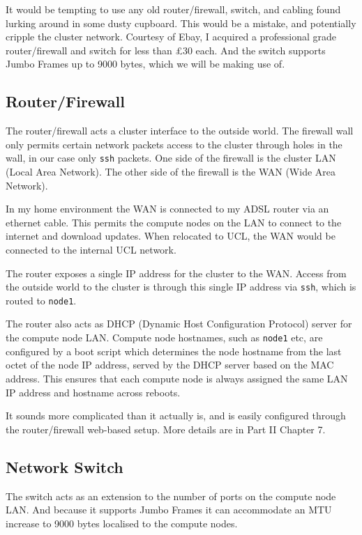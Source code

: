 \documentclass{report}
\begin{document}
It would be tempting to use any old router/firewall, switch, and cabling found lurking around in some dusty cupboard. This would be a mistake, and potentially cripple the cluster network. Courtesy of Ebay, I acquired a professional grade router/firewall and switch for less than £30 each. And the switch supports Jumbo Frames up to 9000 bytes, which we will be making use of.


%
%
\subsection{Router/Firewall}
The router/firewall acts a cluster interface to the outside world. The firewall wall only permits certain network packets access to the cluster through holes in the wall, in our case only \verb|ssh| packets. One side of the firewall is the cluster LAN (Local Area Network). The other side of the firewall is the WAN (Wide Area Network). 

In my home environment the WAN is connected to my ADSL router via an ethernet cable. This permits the compute nodes on the LAN to connect to the internet and download updates. When relocated to UCL, the WAN would be connected to the internal UCL network.

The router exposes a single IP address for the cluster to the WAN. Access from the outside world to the cluster is through this single IP address via \verb|ssh|, which is routed to \verb|node1|.

The router also acts as DHCP (Dynamic Host Configuration Protocol) server for the compute node LAN. Compute node hostnames, such as \verb|node1| etc, are configured by a boot script which determines the node hostname from the last octet of the node IP address, served by the DHCP server based on the MAC address. This ensures that each compute node is always assigned the same LAN IP address and hostname across reboots.

It sounds more complicated than it actually is, and is easily configured through the router/firewall web-based setup. More details are in Part II Chapter 7.


%
%
\subsection{Network Switch}

The switch acts as an extension to the number of ports on the compute node LAN. And because it supports Jumbo Frames it can accommodate an MTU increase to 9000 bytes localised to the compute nodes.
\end{document}
